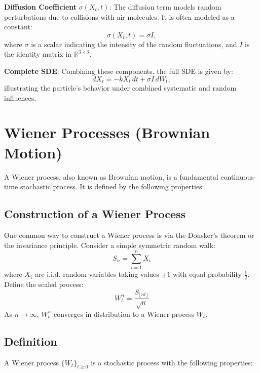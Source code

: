 \documentclass[12pt]{article}
\begin{document}
\textbf{Diffusion Coefficient} \(\sigma(X_t, t)\):
The diffusion term models random perturbations due to collisions with air molecules. It is often modeled as a constant:
\[
\sigma(X_t, t) = \sigma I,
\]
where \(\sigma\) is a scalar indicating the intensity of the random fluctuations, and \(I\) is the identity matrix in \(\mathbb{R}^{3 \times 3}\).

\textbf{Complete SDE}:
Combining these components, the full SDE is given by:
\[
dX_t = -k X_t \, dt + \sigma I \, dW_t,
\]
illustrating the particle's behavior under combined systematic and random influences.
\section{Wiener Processes (Brownian Motion)}

A Wiener process, also known as Brownian motion, is a fundamental continuous-time stochastic process. It is defined by the following properties:

\subsection{Construction of a Wiener Process}
One common way to construct a Wiener process is via the Donsker's theorem or the invariance principle. Consider a simple symmetric random walk:
\[
S_n = \sum_{i=1}^n X_i
\]
where \( X_i \) are i.i.d. random variables taking values \( \pm 1 \) with equal probability \( \frac{1}{2} \). Define the scaled process:
\[
W_t^n = \frac{S_{\lfloor nt \rfloor}}{\sqrt{n}}
\]
As \( n \to \infty \), \( W_t^n \) converges in distribution to a Wiener process \( W_t \).

\subsection{Definition}

A Wiener process \( \{W_t\}_{t \geq 0} \) is a stochastic process with the following properties:
\end{document}
